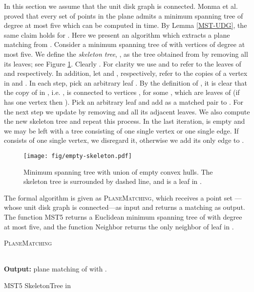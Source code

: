 \documentclass[11pt,a4paper]{article}
\newcommand{\ensure}{\textbf{Output: }}
\begin{document}
In this section we assume that the unit disk graph  is connected. Monma et al. \cite{Monma1992} proved that every set of points in the plane admits a minimum spanning tree of degree at most five which can be computed in  time. By Lemma \ref{MST-UDG}, the same claim holds for . Here we present an algorithm which extracts a plane matching  from . Consider a minimum spanning tree  of  with vertices of degree at most five. We define the {\em skeleton tree}, , as the tree obtained from  by removing all its leaves; see Figure \ref{empty-skeleton-fig}. Clearly . For clarity we use  and  to refer to the leaves of  and  respectively. In addition, let  and , respectively, refer to the copies of a vertex  in  and . In each step, pick an arbitrary leaf . By the definition of , it is clear that the copy of  in , i.e. , is connected to vertices , for some , which are leaves of  (if  has one vertex then ). Pick an arbitrary leaf  and add  as a matched pair to . For the next step we update  by removing  and all its adjacent leaves. We also compute the new skeleton tree and repeat this process. 
In the last iteration,  is empty and we may be left with a tree  consisting of one single vertex or one single edge. If  consists of one single vertex, we disregard it, otherwise we add its only edge to .

\begin{figure}[ht]
  \centering
    \texttt{[image: fig/empty-skeleton.pdf]}
  \caption{Minimum spanning tree  with union of empty convex hulls. The skeleton tree  is surrounded by dashed line, and  is a leaf in . }
\label{empty-skeleton-fig}
\end{figure}

The formal algorithm is given as {\scshape PlaneMatching}, which receives a point set ---whose unit disk graph is connected---as input and returns a matching  as output. The function MST5 returns a Euclidean minimum spanning tree of  with degree at most five, and the function Neighbor returns the only neighbor of leaf  in .

\begin{algorithm}                      \caption{{\scshape PlaneMatching}}          \label{alg1} 
\\
\ensure{plane matching  of  with .}
\begin{algorithmic}[1]
    \State 
    \State MST5
    \State SkeletonTree
    \While {}
	  { in } 
	\State 	
	\State 
	\Else
	    \State 
	\EndIf
    \EndWhile
	\State 
    \EndIf
    \State \Return 
\end{algorithmic}
\end{algorithm}
\end{document}
